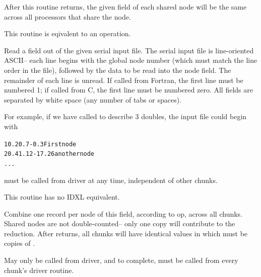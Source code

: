\documentclass[10pt]{article}
\begin{document}
     After this routine returns, the given field of each shared node
     will be the same across all processors that share the node.
     
     This routine is eqivalent to an  operation.


     Read a field out of the given serial input file.  The serial input
     file is line-oriented ASCII-- each line begins with the global
     node number (which must match the line order in the file),
     followed by the data to be read into the node field.  The
     remainder of each line is unread.  If called from Fortran, the
     first line must be numbered 1; if called from C, the first line
     must be numbered zero.  All fields are separated by white space
     (any number of tabs or spaces).

     For example, if we have called  to describe 3 doubles,
     the input file could begin with

\begin{alltt}
          1    0.2    0.7    -0.3      First node
          2    0.4    1.12   -17.26    another node
          ...
\end{alltt}

      must be called from driver at any time, independent
     of other chunks. 
     
     This routine has no IDXL equivalent.


Combine one record per node of this field, according to op, across all chunks.
Shared nodes are not double-counted-- only one copy will contribute to the
reduction.  After  returns, all chunks will have identical
values in  which must be  copies of .

     May only be called from driver, and to complete, must be called
     from every chunk's driver routine.
\end{document}
